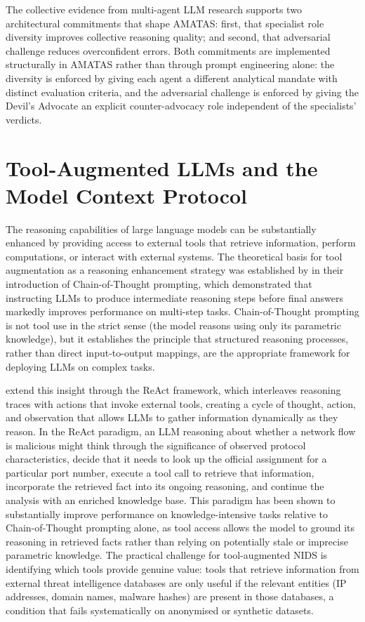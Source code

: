 The collective evidence from multi-agent LLM research supports two architectural commitments that shape AMATAS: first, that specialist role diversity improves collective reasoning quality; and second, that adversarial challenge reduces overconfident errors. Both commitments are implemented structurally in AMATAS rather than through prompt engineering alone: the diversity is enforced by giving each agent a different analytical mandate with distinct evaluation criteria, and the adversarial challenge is enforced by giving the Devil's Advocate an explicit counter-advocacy role independent of the specialists' verdicts.

\section{Tool-Augmented LLMs and the Model Context Protocol}
\label{sec:tool-augmented-llms}

The reasoning capabilities of large language models can be substantially enhanced by providing access to external tools that retrieve information, perform computations, or interact with external systems. The theoretical basis for tool augmentation as a reasoning enhancement strategy was established by \textcite{Wei2022} in their introduction of Chain-of-Thought prompting, which demonstrated that instructing LLMs to produce intermediate reasoning steps before final answers markedly improves performance on multi-step tasks. Chain-of-Thought prompting is not tool use in the strict sense (the model reasons using only its parametric knowledge), but it establishes the principle that structured reasoning processes, rather than direct input-to-output mappings, are the appropriate framework for deploying LLMs on complex tasks.

\textcite{Yao2023} extend this insight through the ReAct framework, which interleaves reasoning traces with actions that invoke external tools, creating a cycle of thought, action, and observation that allows LLMs to gather information dynamically as they reason. In the ReAct paradigm, an LLM reasoning about whether a network flow is malicious might think through the significance of observed protocol characteristics, decide that it needs to look up the official assignment for a particular port number, execute a tool call to retrieve that information, incorporate the retrieved fact into its ongoing reasoning, and continue the analysis with an enriched knowledge base. This paradigm has been shown to substantially improve performance on knowledge-intensive tasks relative to Chain-of-Thought prompting alone, as tool access allows the model to ground its reasoning in retrieved facts rather than relying on potentially stale or imprecise parametric knowledge. The practical challenge for tool-augmented NIDS is identifying which tools provide genuine value: tools that retrieve information from external threat intelligence databases are only useful if the relevant entities (IP addresses, domain names, malware hashes) are present in those databases, a condition that fails systematically on anonymised or synthetic datasets.

